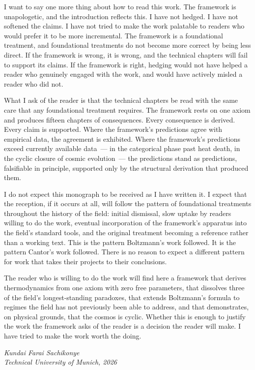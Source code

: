 \medskip

I want to say one more thing about how to read this work. The framework is
unapologetic, and the introduction reflects this. I have not hedged. I have not
softened the claims. I have not tried to make the work palatable to readers who would
prefer it to be more incremental. The framework is a foundational treatment, and
foundational treatments do not become more correct by being less direct. If the
framework is wrong, it is wrong, and the technical chapters will fail to support its
claims. If the framework is right, hedging would not have helped a reader who
genuinely engaged with the work, and would have actively misled a reader who did not.

What I ask of the reader is that the technical chapters be read with the same care
that any foundational treatment requires. The framework rests on one axiom and
produces fifteen chapters of consequences. Every consequence is derived. Every claim
is supported. Where the framework's predictions agree with empirical data, the
agreement is exhibited. Where the framework's predictions exceed currently available
data~--- in the categorical phase past heat death, in the cyclic closure of cosmic
evolution~--- the predictions stand as predictions, falsifiable in principle, supported
only by the structural derivation that produced them.

I do not expect this monograph to be received as I have written it. I expect that
the reception, if it occurs at all, will follow the pattern of foundational treatments
throughout the history of the field: initial dismissal, slow uptake by readers willing
to do the work, eventual incorporation of the framework's apparatus into the field's
standard tools, and the original treatment becoming a reference rather than a working
text. This is the pattern Boltzmann's work followed. It is the pattern Cantor's work
followed. There is no reason to expect a different pattern for work that takes their
projects to their conclusions.

The reader who is willing to do the work will find here a framework that derives
thermodynamics from one axiom with zero free parameters, that dissolves three of the
field's longest-standing paradoxes, that extends Boltzmann's formula to regimes the
field has not previously been able to address, and that demonstrates, on physical
grounds, that the cosmos is cyclic. Whether this is enough to justify the work the
framework asks of the reader is a decision the reader will make. I have tried to make
the work worth the doing.

\bigskip

\noindent\textit{Kundai Farai Sachikonye}\\
\textit{Technical University of Munich, 2026}
